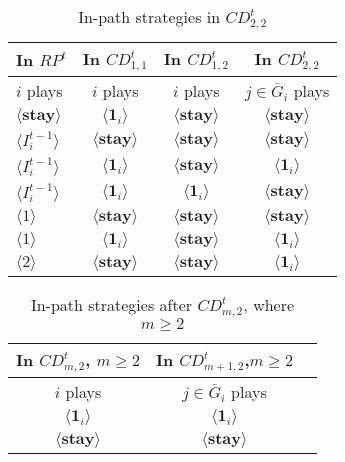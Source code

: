 \documentclass[12pt,letter]{article}
\theoremstyle{definition}
\theoremstyle{remark}
\theoremstyle{claim}
\begin{document}
\begin{table}[t]
\caption{In-path strategies in $CD^t_{2,2}$}
\label{Table_stg_cdt12}
\begin{center}
\begin{tabular}{l c c c}
In $RP^t$ 	 	&  	In $CD^t_{1,1}$		&  In $CD^t_{1,2}$	  & In $CD^t_{2,2}$ \\
\hline
\hline
$i$ plays 		                             &  	$i$ plays		&				$i$ plays			& $j\in \bar{G}_i$ plays  \\
\hline
$\langle  \textbf{stay} \rangle$ 	& 	$\langle \mathbf{1}_i \rangle$	&  $\langle \textbf{stay} \rangle$ &  $\langle \textbf{stay} \rangle$ \\
$\langle  {I^{t-1}_i} \rangle$ 		&  $\langle \textbf{stay} \rangle$	&	$\langle \textbf{stay} \rangle$ &  $\langle \textbf{stay} \rangle$   \\
$\langle  {I^{t-1}_i} \rangle$ 		&  $\langle \mathbf{1}_i \rangle$	&	$\langle \textbf{stay} \rangle$ &  $\langle \mathbf{1}_i \rangle$    \\
$\langle  {I^{t-1}_i} \rangle$ 		&  $\langle \mathbf{1}_i \rangle$	&	$\langle \mathbf{1}_i \rangle$ &  $\langle \textbf{stay} \rangle$  \\
$\langle 1 \rangle$ 		             &  $\langle \textbf{stay} \rangle$	&	$\langle \textbf{stay} \rangle$ &  $\langle \textbf{stay} \rangle$\\
$\langle 1 \rangle$ 		             &  $\langle \mathbf{1}_i \rangle$	&	$\langle \textbf{stay} \rangle$ & $\langle \mathbf{1}_i \rangle$\\
$\langle 2 \rangle$ 		             &  $\langle \textbf{stay} \rangle$	&	$\langle \textbf{stay} \rangle$ &  $\langle \mathbf{1}_i \rangle$
\end{tabular}
\end{center}
\end{table}

\begin{table}[t]
\caption{In-path strategies after $CD^t_{m,2}$, where $m\geq 2$}
\label{Table_stg_cdtm2}
\begin{center}
\begin{tabular}{c c c}
In $CD^t_{m,2}$, $m\geq 2$ 	 	&  	In $CD^t_{m+1,2}$,$m\geq 2$		& 	\\
\hline
\hline
$i$ plays 		  							&  $j\in \bar{G}_{i}$ plays  								& \\
\hline
$\langle \mathbf{1}_i \rangle$ 	& 	$\langle \mathbf{1}_i \rangle$	    &  \\
$\langle \textbf{stay} \rangle$		&  $\langle \textbf{stay} \rangle$	&  \\

\end{tabular}
\end{center}
\end{table}
\end{document}
